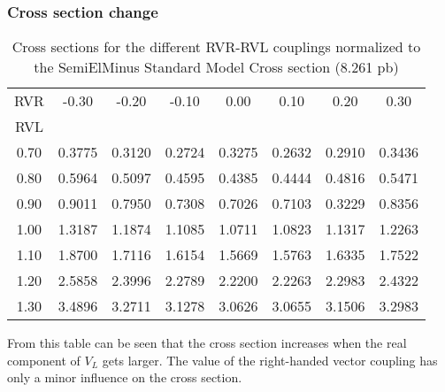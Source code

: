 \subsubsection{Cross section change}
\begin{table}[h!] 
 \begin{tabular}{c|c c c c c c c} 
  RVR &  -0.30  &  -0.20  &  -0.10  &  0.00  &  0.10  &  0.20  &   0.30  \\  
  RVL & & & & & & & \\ 
  \hline 
  0.70  & 0.3775 &  0.3120  & 0.2724  & 0.3275  & 0.2632  & 0.2910 &  0.3436  \\ 
  0.80  & 0.5964 &  0.5097  & 0.4595  & 0.4385  & 0.4444  & 0.4816 &  0.5471  \\ 
  0.90  & 0.9011 &  0.7950  & 0.7308  & 0.7026  & 0.7103  & 0.3229 &  0.8356  \\ 
  1.00  & 1.3187 &  1.1874  & 1.1085  & 1.0711  & 1.0823  & 1.1317 &  1.2263  \\ 
  1.10  & 1.8700 &  1.7116  & 1.6154  & 1.5669  & 1.5763  & 1.6335 &  1.7522  \\ 
  1.20  & 2.5858 &  2.3996  & 2.2789  & 2.2200  & 2.2263  & 2.2983 &  2.4322  \\ 
  1.30  & 3.4896 &  3.2711  & 3.1278  & 3.0626  & 3.0655  & 3.1506 &  3.2983  \\ 
 \end{tabular} 
 \caption{Cross sections for the different RVR-RVL couplings normalized to the SemiElMinus Standard Model Cross section (8.261 pb)} 
\end{table}
From this table can be seen that the cross section increases when the real component of $V_L$ gets larger. The value of the right-handed vector coupling has only a minor influence on the cross section.

